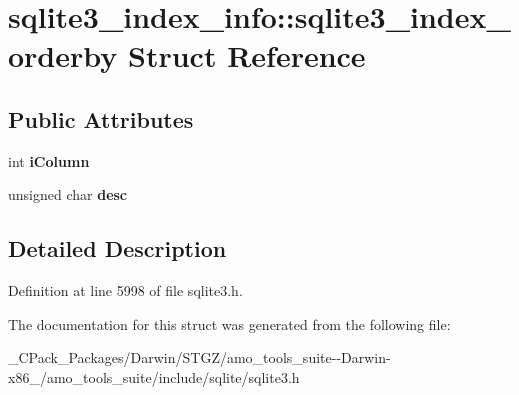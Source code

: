 \hypertarget{structsqlite3__index__info_1_1sqlite3__index__orderby}{}\section{sqlite3\+\_\+index\+\_\+info\+:\+:sqlite3\+\_\+index\+\_\+orderby Struct Reference}
\label{structsqlite3__index__info_1_1sqlite3__index__orderby}
\subsection*{Public Attributes}
\begin{DoxyCompactItemize}
\item 
\mbox{\label{structsqlite3__index__info_1_1sqlite3__index__orderby_a266396085bfda9acef3f13eaa170cd2f}} 
int {\bfseries i\+Column}
\item 
\mbox{\label{structsqlite3__index__info_1_1sqlite3__index__orderby_a0586d1b5d36221af96aeba8cfc56e9c6}} 
unsigned char {\bfseries desc}
\end{DoxyCompactItemize}


\subsection{Detailed Description}


Definition at line 5998 of file sqlite3.\+h.



The documentation for this struct was generated from the following file\+:\begin{DoxyCompactItemize}
\item 
\+\_\+\+C\+Pack\+\_\+\+Packages/\+Darwin/\+S\+T\+G\+Z/amo\+\_\+tools\+\_\+suite-\/-\/\+Darwin-\/x86\+\_/amo\+\_\+tools\+\_\+suite/include/sqlite/sqlite3.\+h\end{DoxyCompactItemize}
